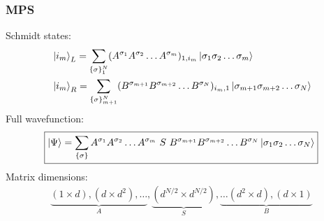 \documentclass{beamer}
\theoremstyle{definition}
\begin{document}
\begin{frame}
	\frametitle{MPS}
	Schmidt states:
	\begin{align*}
		&\ket{i_m}_L = \sum_{\{\sigma\}_1^N} (A^{\sigma_1}A^{\sigma_2}\dots A^{\sigma_m})_{1,i_m}  \ket{\sigma_1 \sigma_2\dots\sigma_m} \\
		&\ket{i_m}_R = \sum_{\{\sigma\}_{m+1}^N} (B^{\sigma_{m+1}}B^{\sigma_{m+2}}\dots B^{\sigma_N})_{i_m,1}  \ket{\sigma_{m+1}\sigma_{m+2}\dots\sigma_N} 
	\end{align*}
	\pause
	Full wavefunction:
	\begin{align*}
		\boxed{\ket{\Psi} = \sum_{\{\sigma\}}    A^{\sigma_1}A^{\sigma_2}\dots A^{\sigma_m}  \,\,{S}\,\, B^{\sigma_{m+1}}B^{\sigma_{m+2}}\dots B^{\sigma_N}  \ket{\sigma_1\sigma_2\dots \sigma_N}}
	\end{align*}
	Matrix dimensions:
	\begin{align*}
		\underbrace{(1\times d), (d\times d^2), \dots }_{A}, \underbrace{(d^{N/2}\times d^{N/2})}_{S},  \underbrace{\dots (d^2\times d), (d\times 1)}_{B}
	\end{align*}


\end{frame}
\end{document}
